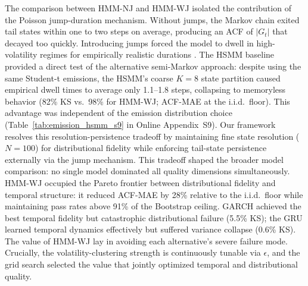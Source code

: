 The comparison between HMM-NJ and HMM-WJ isolated the contribution of the Poisson jump-duration mechanism. Without jumps, the Markov chain exited tail states within one to two steps on average, producing an ACF of $|G_t|$ that decayed too quickly. Introducing jumps forced the model to dwell in high-volatility regimes for empirically realistic durations \cite{ryden_stylized_1998, bulla_stylized_2006}. The HSMM baseline provided a direct test of the alternative semi-Markov approach: despite using the same Student-t emissions, the HSMM's coarse $K=8$ state partition caused empirical dwell times to average only 1.1--1.8 steps, collapsing to memoryless behavior (82\% KS vs.\ 98\% for HMM-WJ; ACF-MAE at the i.i.d.\ floor). This advantage was independent of the emission distribution choice (Table~\ref{tab:emission_hsmm_s9} in Online Appendix~S9). Our framework resolves this resolution-persistence tradeoff by maintaining fine state resolution ($N=100$) for distributional fidelity while enforcing tail-state persistence externally via the jump mechanism. This tradeoff shaped the broader model comparison: no single model dominated all quality dimensions simultaneously. HMM-WJ occupied the Pareto frontier between distributional fidelity and temporal structure: it reduced ACF-MAE by 28\% relative to the i.i.d.\ floor while maintaining pass rates above 91\% of the Bootstrap ceiling. GARCH achieved the best temporal fidelity but catastrophic distributional failure (5.5\% KS); the GRU learned temporal dynamics effectively but suffered variance collapse (0.6\% KS). The value of HMM-WJ lay in avoiding each alternative's severe failure mode. Crucially, the volatility-clustering strength is continuously tunable via $\epsilon$, and the grid search selected the value that jointly optimized temporal and distributional quality.

